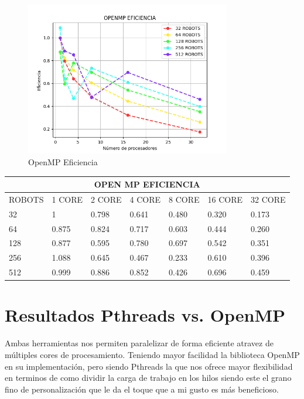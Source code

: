 \documentclass[oneside,twocolumn]{article}
\begin{document}
\begin{figure}[h]
    \centering
    \includegraphics[width=0.80\textwidth]{graficos/openmp/openmp_eff.png}
    \caption{OpenMP Eficiencia}
    \label{fig:secuencial}
\end{figure}

\begin{center}
\begin{tabular}{ |p{2cm}||p{2cm}||p{2cm}||p{2cm}||p{2cm}||p{2cm}||p{2cm}| }
 \hline
 \multicolumn{7}{|c|}{OPEN MP EFICIENCIA} \\
 \hline
 ROBOTS & 1 CORE & 2 CORE & 4 CORE & 8 CORE & 16 CORE & 32 CORE\\
 \hline
 32   & 1     & 0.798 & 0.641 & 0.480 & 0.320 & 0.173\\ \hline
 64   & 0.875 & 0.824 & 0.717 & 0.603 & 0.444 & 0.260\\ \hline
 128  & 0.877 & 0.595 & 0.780 & 0.697 & 0.542 & 0.351\\ \hline
 256  & 1.088 & 0.645 & 0.467 & 0.233 & 0.610 & 0.396\\ \hline
 512  & 0.999 & 0.886 & 0.852 & 0.426 & 0.696 & 0.459\\ \hline
 \hline
\end{tabular}
\end{center}

\newpage
\onecolumn
\section{Resultados Pthreads vs. OpenMP}

Ambas herramientas nos permiten paralelizar de forma eficiente atravez de múltiples cores de procesamiento. Teniendo mayor facilidad la biblioteca OpenMP en su implementación, pero siendo Pthreads la que nos ofrece mayor flexibilidad en terminos de como dividir la carga de trabajo en los hilos siendo este el grano fino de personalización que le da el toque que a mi gusto es más beneficioso.\\
\end{document}
